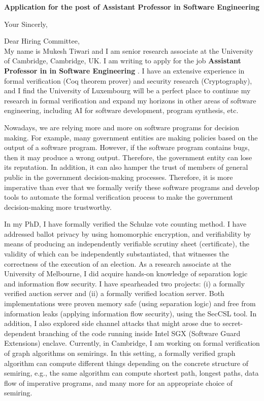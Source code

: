 \documentclass[11pt,a4paper,roman]{moderncv}
\begin{document}
\date{}
\opening{\textbf{Application for the post of Assistant Professor in Software Engineering }}
\closing{Your Sincerly, \vspace{-1em}}



\makelettertitle


Dear Hiring Committee, 
\\
\vspace{1em}
My name is Mukesh Tiwari and  I am senior research associate at 
the University of Cambridge, Cambridge, UK. 
I am writing to apply
for the job \textbf{Assistant Professor in in Software Engineering }. 
I have an extensive experience in
formal verification (Coq theorem prover) and security research (Cryptography), and 
I find the 
University of Luxembourg will be  
a perfect place to continue my research in formal verification and expand my horizons in other areas of
software engineering, including AI for software development, program 
synthesis, etc. 


\vspace{0.5cm}
Nowadays, we are relying more and more on software programs for decision making. 
For example, many government entities are making policies based on the 
output of a software program. However, if the software program 
contains bugs, then it may produce a wrong output. Therefore, the government entity 
can lose its reputation. In addition, it can also hamper 
the trust of members of general public in the government decision-making processes. 
Therefore, it is more imperative than ever that we formally verify these software programs 
and develop tools to automate the formal verification process to make the government 
decision-making more trustworthy. 


In my PhD, I have formally verified the Schulze vote counting method. I have addressed ballot privacy by using 
homomorphic encryption, and verifiability by means of producing an independently verifiable scrutiny 
sheet (certificate), the validity of which can be independently substantiated, that witnesses the 
correctness of the execution of an election.  As a research associate at the University of Melbourne, 
I did acquire hands-on knowledge of separation logic and information flow security. I have spearheaded 
two projects: (i) a formally verified auction server and (ii) a formally verified location server. 
Both implementations were proven memory safe (using separation logic) and free from information 
leaks (applying information flow security), using the SecCSL tool. In addition, I also explored side 
channel attacks that might arose due to secret-dependent branching of the code running inside
Intel SGX (Software Guard Extensions) enclave. Currently, in Cambridge, I am working on 
formal verification of graph algorithms on semirings. In this setting, a formally verified graph
 algorithm can compute different things depending on the concrete structure of semiring, e.g., the 
 same algorithm can compute shortest path, longest paths, data flow of imperative 
 programs, and many more for an appropriate choice of semiring.
\end{document}
